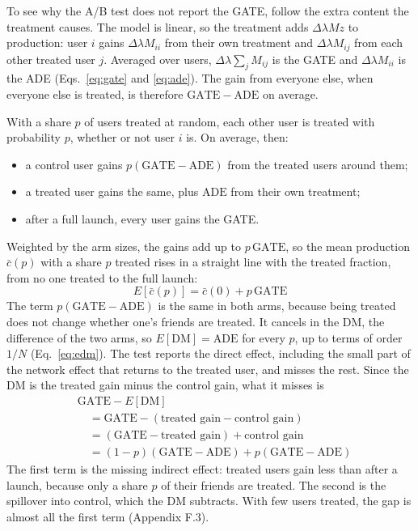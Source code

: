 \documentclass[final,5p,times,twocolumn,number]{elsarticle}
\begin{document}
To see why the A/B test does not report the GATE, follow the extra content the treatment causes. The model is linear, so the treatment adds $\Delta\lambda Mz$  to production: user $i$  gains $\Delta\lambda M_{ii}$  from their own treatment and $\Delta\lambda M_{ij}$  from each other treated user $j$. Averaged over users, $\Delta\lambda\sum_j M_{ij}$  is the GATE and $\Delta\lambda M_{ii}$  is the ADE (Eqs.~\ref{eq:gate} and \ref{eq:ade}). The gain from everyone else, when everyone else is treated, is therefore $\mathrm{GATE} - \mathrm{ADE}$  on average.


With a share $p$  of users treated at random, each other user is treated with probability $p$, whether or not user $i$  is. On average, then:


\begin{itemize}
\item a control user gains $p(\mathrm{GATE} - \mathrm{ADE})$  from the treated users around them;
\item a treated user gains the same, plus $\mathrm{ADE}$  from their own treatment;
\item after a full launch, every user gains the GATE.
\end{itemize}

Weighted by the arm sizes, the gains add up to $p\,\mathrm{GATE}$, so the mean production $\bar c(p)$  with a share $p$  treated rises in a straight line with the treated fraction, from no one treated to the full launch:
\begin{equation}E[\bar c(p)] = \bar c(0) + p\,\mathrm{GATE}\label{eq:linear}\end{equation}
The term $p(\mathrm{GATE} - \mathrm{ADE})$  is the same in both arms, because being treated does not change whether one's friends are treated. It cancels in the DM, the difference of the two arms, so $E[\mathrm{DM}] = \mathrm{ADE}$  for every $p$, up to terms of order $1/N$  (Eq.~\ref{eq:edm}). The test reports the direct effect, including the small part of the network effect that returns to the treated user, and misses the rest. Since the DM is the treated gain minus the control gain, what it misses is
\begin{equation}\begin{aligned}&\mathrm{GATE} - E[\mathrm{DM}]\\ &\quad= \mathrm{GATE} - (\text{treated gain} - \text{control gain})\\ &\quad= (\mathrm{GATE} - \text{treated gain}) + \text{control gain}\\ &\quad= (1 - p)(\mathrm{GATE} - \mathrm{ADE}) + p(\mathrm{GATE} - \mathrm{ADE})\end{aligned}\label{eq:gap}\end{equation}
The first term is the missing indirect effect: treated users gain less than after a launch, because only a share $p$  of their friends are treated. The second is the spillover into control, which the DM subtracts. With few users treated, the gap is almost all the first term (Appendix F.3).
\end{document}
